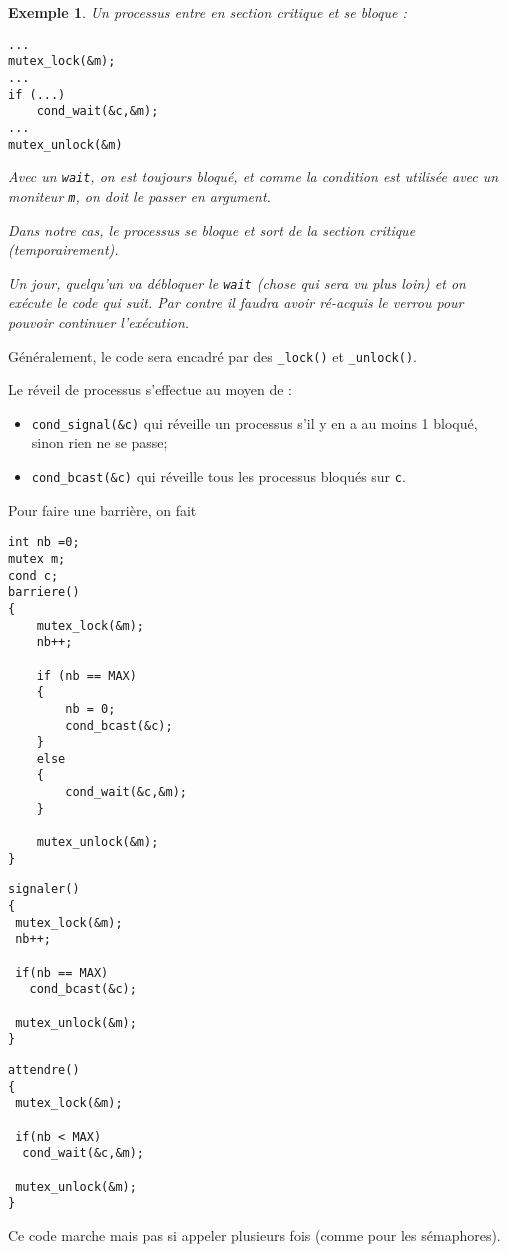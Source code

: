 \documentclass[12pt,a4paper]{report}
\newtheorem*{ex}{Exemple}
\begin{document}
\begin{ex}
  Un processus entre en section critique et se bloque :
  \begin{center}
\begin{verbatim}
...
mutex_lock(&m);
...
if (...)
    cond_wait(&c,&m);
...
mutex_unlock(&m)
\end{verbatim}
  \end{center}

Avec un \verb?wait?, on est toujours bloqué, et comme la condition est utilisée avec un moniteur \verb?m?, on doit le passer en argument.

Dans notre cas, le processus se bloque et sort de la section critique (temporairement).

Un jour, quelqu'un va débloquer le \verb?wait? (chose qui sera vu plus loin) et on exécute le code qui suit. Par contre il faudra avoir ré-acquis le verrou pour pouvoir continuer l'exécution.
\end{ex}

Généralement, le code sera encadré par des \verb?_lock()? et \verb?_unlock()?.

Le réveil de processus s'effectue au moyen de :
\begin{itemize}
\item \verb?cond_signal(&c)? qui réveille un processus s'il y en a au moins 1 bloqué, sinon rien ne se passe;
\item \verb?cond_bcast(&c)? qui réveille tous les processus bloqués sur \texttt{c}.
\end{itemize}

Pour faire une barrière, on fait

\begin{center}
\begin{verbatim}
int nb =0;
mutex m;
cond c;
barriere()
{
    mutex_lock(&m);
    nb++;

    if (nb == MAX)
    {
        nb = 0;
        cond_bcast(&c);
    }
    else
    {
        cond_wait(&c,&m);
    }

    mutex_unlock(&m);
}
\end{verbatim}
\end{center}

\begin{minipage}{0.6\linewidth}
\begin{verbatim}
signaler()
{
 mutex_lock(&m);
 nb++;

 if(nb == MAX)
   cond_bcast(&c);

 mutex_unlock(&m);
}
\end{verbatim}
\end{minipage}
\begin{minipage}{0.6\linewidth}
\begin{verbatim}
attendre()
{
 mutex_lock(&m);

 if(nb < MAX)
  cond_wait(&c,&m);

 mutex_unlock(&m);
}
\end{verbatim}
\end{minipage}
Ce code marche mais pas si appeler plusieurs fois (comme pour les sémaphores).\\
\end{document}
